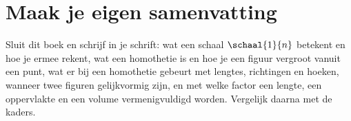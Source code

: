 
\begin{oefeningen}






\end{oefeningen}


\ifzelfstudie
\section*{Maak je eigen samenvatting}
Sluit dit boek en schrijf in je schrift: wat een schaal $\schaal{1}{n}$ betekent en hoe je ermee rekent, wat een homothetie is en hoe je een figuur vergroot vanuit een punt, wat er bij een homothetie gebeurt met lengtes, richtingen en hoeken, wanneer twee figuren gelijkvormig zijn, en met welke factor een lengte, een oppervlakte en een volume vermenigvuldigd worden. Vergelijk daarna met de kaders.
\fi
